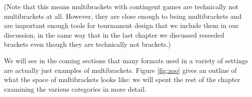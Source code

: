 {    

    (Note that this means multibrackets with contingent games are technically not multibrackets at all. However, they are close enough to being multibrackets and are important enough tools for tournament design that we include them in our discussion, in the same way that in the last chapter we discussed reseeded brackets even though they are technically not brackets.)

    We will see in the coming sections that many formats used in a variety of settings are actually just examples of multibrackets. Figure \ref{fig:zoo} gives an outline of what the space of multibrackets looks like: we will spent the rest of the chapter examining the various categories in more detail.

}